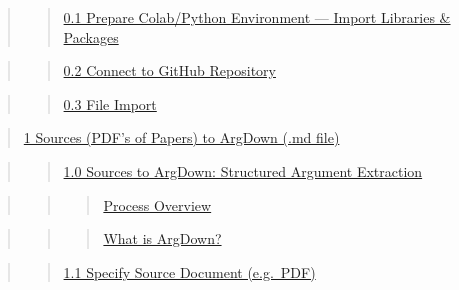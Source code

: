 \documentclass[
  11pt,
  letterpaper,
]{book}
\begin{document}
\begin{quote}
\begin{quote}
\hyperref[scrollTo=GtVFO-s74vI_ux26uniqifier=1]{0.1 Prepare Colab/Python
Environment --- Import Libraries \& Packages}
\end{quote}
\end{quote}

\begin{quote}
\begin{quote}
\hyperref[scrollTo=2a3VR0fLhJowux26uniqifier=1]{0.2 Connect to GitHub
Repository}
\end{quote}
\end{quote}

\begin{quote}
\begin{quote}
\hyperref[scrollTo=y-ix4Rp5fE9mux26uniqifier=1]{0.3 File Import}
\end{quote}
\end{quote}

\begin{quote}
\hyperref[scrollTo=52XyPlte5HrUux26uniqifier=1]{1 Sources (PDF's of
Papers) to ArgDown (.md file)}
\end{quote}

\begin{quote}
\begin{quote}
\hyperref[scrollTo=1-7O4KHfNU-eux26uniqifier=1]{1.0 Sources to ArgDown:
Structured Argument Extraction}
\end{quote}
\end{quote}

\begin{quote}
\begin{quote}
\begin{quote}
\hyperref[scrollTo=1-7O4KHfNU-eux26uniqifier=1]{Process Overview}
\end{quote}
\end{quote}
\end{quote}

\begin{quote}
\begin{quote}
\begin{quote}
\hyperref[scrollTo=1-7O4KHfNU-eux26uniqifier=1]{What is ArgDown?}
\end{quote}
\end{quote}
\end{quote}

\begin{quote}
\begin{quote}
\hyperref[scrollTo=ESKnZ_4f_a6yux26uniqifier=1]{1.1 Specify Source
Document (e.g.~PDF)}
\end{quote}
\end{quote}
\end{document}
